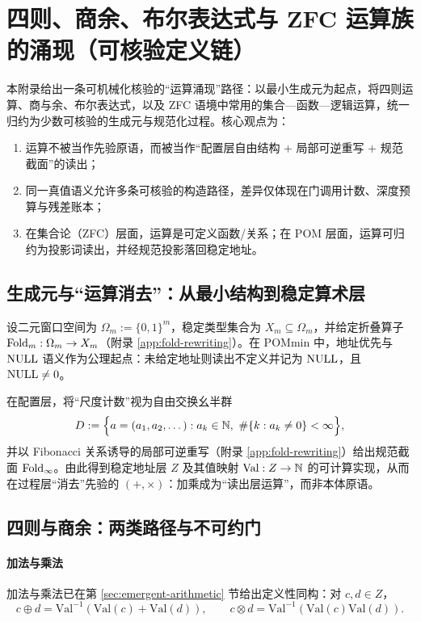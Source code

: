 \section{四则、商余、布尔表达式与 ZFC 运算族的涌现（可核验定义链）}\label{app:ops-zfc}

本附录给出一条可机械化核验的“运算涌现”路径：以最小生成元为起点，将四则运算、商与余、布尔表达式，以及 ZFC 语境中常用的集合—函数—逻辑运算，统一归约为少数可核验的生成元与规范化过程。核心观点为：
\begin{enumerate}
  \item 运算不被当作先验原语，而被当作“配置层自由结构 + 局部可逆重写 + 规范截面”的读出；
  \item 同一真值语义允许多条可核验的构造路径，差异仅体现在门调用计数、深度预算与残差账本；
  \item 在集合论（ZFC）层面，运算是可定义函数/关系；在 POM 层面，运算可归约为投影词读出，并经规范投影落回稳定地址。
\end{enumerate}

\subsection{生成元与“运算消去”：从最小结构到稳定算术层}
设二元窗口空间为 $\Omega_m := \{0,1\}^m$，稳定类型集合为 $X_m\subseteq \Omega_m$，并给定折叠算子 $\mathrm{Fold}_m:\Omega_m\to X_m$（附录 \ref{app:fold-rewriting}）。在 POMmin 中，地址优先与 $\mathrm{NULL}$ 语义作为公理起点：未给定地址则读出不定义并记为 $\mathrm{NULL}$，且 $\mathrm{NULL}\neq 0$。

在配置层，将“尺度计数”视为自由交换幺半群
$$
D:=\Bigl\{a=(a_1,a_2,\dots):a_k\in\NN,\ \#\{k:a_k\neq 0\}<\infty\Bigr\},
$$
并以 Fibonacci 关系诱导的局部可逆重写（附录 \ref{app:fold-rewriting}）给出规范截面 $\mathrm{Fold}_\infty$。由此得到稳定地址层 $Z$ 及其值映射 $\mathrm{Val}:Z\to\mathbb{N}$ 的可计算实现，从而在过程层“消去”先验的 $(+,\times)$：加乘成为“读出层运算”，而非本体原语。

\subsection{四则与商余：两类路径与不可约门}
\paragraph{加法与乘法} 加法与乘法已在第 \ref{sec:emergent-arithmetic} 节给出定义性同构：对 $c,d\in Z$，
$$
c\oplus d=\mathrm{Val}^{-1}(\mathrm{Val}(c)+\mathrm{Val}(d)),\qquad
c\otimes d=\mathrm{Val}^{-1}(\mathrm{Val}(c)\mathrm{Val}(d)).
$$

